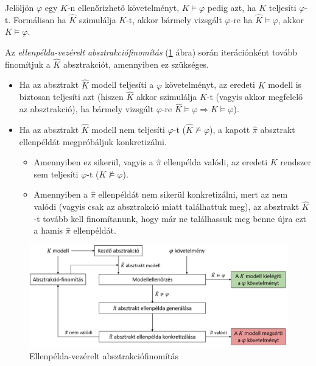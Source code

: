 Jelöljön $\varphi$ egy $K$-n ellenőrizhető követelményt, $K \models \varphi$ pedig azt, ha $K$ teljesíti $\varphi$-t. Formálisan ha $\hat{K}$ szimulálja $K$-t, akkor bármely vizsgált $\varphi$-re ha $\hat{K} \models \varphi$, akkor $K \models \varphi$.

Az \emph{ellenpélda-vezérelt absztrakciófinomítás} \cite{IntroductionToModelChecking} (\ref{fig:cegar} ábra) során iterációnként tovább finomítjuk a $\hat{K}$ absztrakciót, amennyiben ez szükséges.
\begin{itemize}
    \item Ha az absztrakt $\hat{K}$ modell teljesíti a $\varphi$ követelményt, az eredeti $K$ modell is biztosan teljesíti azt (hiszen $\hat{K}$ akkor szimulálja $K$-t (vagyis akkor megfelelő az absztrakció), ha bármely vizsgált $\varphi$-re $\hat{K} \models \varphi \Rightarrow K \models \varphi$).
    \item Ha az absztrakt $\hat{K}$ modell nem teljesíti $\varphi$-t ($\hat{K} \not \models \varphi$), a kapott $\hat{\pi}$ absztrakt ellenpéldát megpróbáljuk konkretizálni.
    \begin{itemize}
        \item Amennyiben ez sikerül, vagyis a $\hat{\pi}$ ellenpélda valódi, az eredeti $K$ rendszer sem teljesíti $\varphi$-t ($K \not \models \varphi$).
        \item Amennyiben a $\hat{\pi}$ ellenpéldát nem sikerül konkretizálni, mert az nem valódi (vagyis csak az absztrakció miatt találhattuk meg), az absztrakt $\hat{K}$-t tovább kell finomítanunk, hogy már ne találhassuk meg benne újra ezt a hamis $\hat{\pi}$ ellenpéldát.
    \end{itemize}
\end{itemize}

\begin{figure}
    \centering
    \includegraphics[width=\textwidth, keepaspectratio]{figures/cegar.png}
    \caption{Ellenpélda-vezérelt absztrakciófinomítás}
    \label{fig:cegar}
\end{figure}

